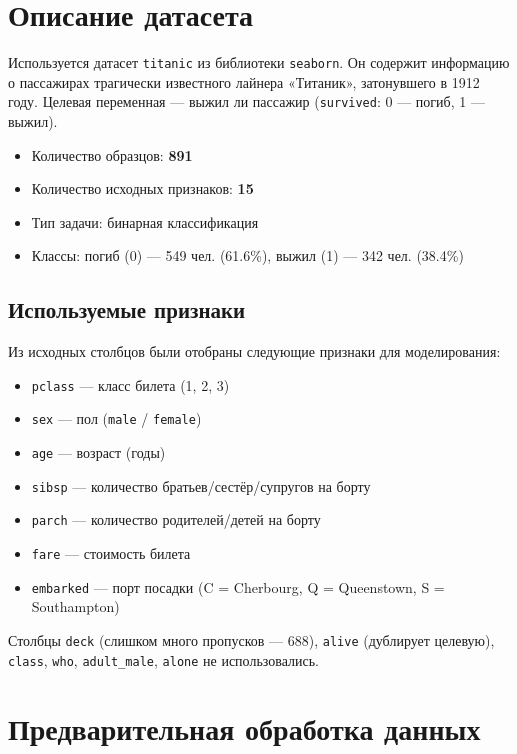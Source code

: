 \documentclass[12pt,a4paper]{article}
\begin{document}
\section{Описание датасета}

Используется датасет \texttt{titanic} из библиотеки
\texttt{seaborn}. Он содержит информацию о пассажирах
трагически известного лайнера «Титаник», затонувшего в 1912 году.
Целевая переменная — выжил ли пассажир (\texttt{survived}:
0 — погиб, 1 — выжил).

\begin{itemize}[nosep]
    \item Количество образцов: \textbf{891}
    \item Количество исходных признаков: \textbf{15}
    \item Тип задачи: бинарная классификация
    \item Классы: погиб (0) — 549 чел. (61.6\%), выжил (1) — 342 чел. (38.4\%)
\end{itemize}

\subsection{Используемые признаки}

Из исходных столбцов были отобраны следующие признаки для моделирования:

\begin{itemize}[nosep]
    \item \texttt{pclass} — класс билета (1, 2, 3)
    \item \texttt{sex} — пол (\texttt{male} / \texttt{female})
    \item \texttt{age} — возраст (годы)
    \item \texttt{sibsp} — количество братьев/сестёр/супругов на борту
    \item \texttt{parch} — количество родителей/детей на борту
    \item \texttt{fare} — стоимость билета
    \item \texttt{embarked} — порт посадки (C = Cherbourg, Q = Queenstown, S = Southampton)
\end{itemize}

Столбцы \texttt{deck} (слишком много пропусков — 688), \texttt{alive}
(дублирует целевую), \texttt{class}, \texttt{who}, \texttt{adult\_male},
\texttt{alone} не использовались.

\section{Предварительная обработка данных}
\end{document}
